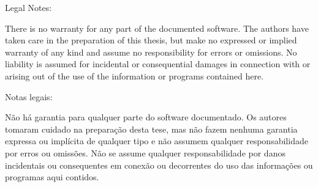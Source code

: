 

\ifenglish
    Legal Notes:

    There is no warranty for any part of the documented software. The authors have taken care in the
    preparation of this thesis, but make no expressed or implied warranty of any kind and assume no
    responsibility for errors or omissions. No liability is assumed for incidental or consequential
    damages in connection with or arising out of the use of the information or programs contained here.

\else

    Notas legais:

    Não há garantia para qualquer parte do software documentado. Os autores tomaram cuidado na
    preparação desta tese, mas não fazem nenhuma garantia expressa ou implícita de qualquer tipo e não
    assumem qualquer responsabilidade por erros ou omissões. Não se assume qualquer responsabilidade por
    danos incidentais ou consequentes em conexão ou decorrentes do uso das informações ou programas aqui
    contidos.

\fi


